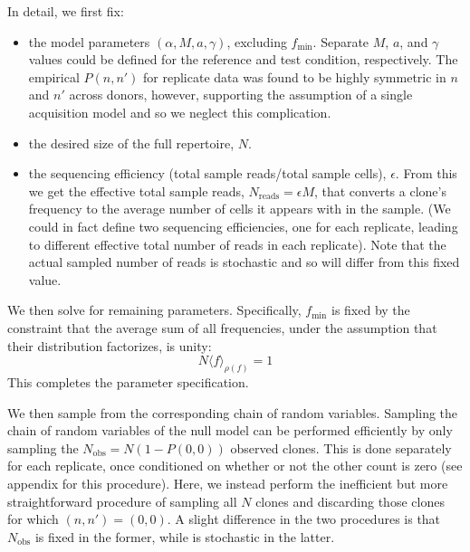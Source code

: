 \documentclass[letterpaper,english,prl,reprint,longbibliography]{revtex4-1} %
\begin{document}
In detail, we first fix:
\begin{itemize}
\item  the model parameters $(\alpha,M,a,\gamma)$, excluding $f_{\textrm{min}}$. Separate $M$, $a$, and $\gamma$ values could be defined for the reference and test condition, respectively. The empirical $P(n,n')$ for replicate data was found to be highly symmetric in $n$ and $n'$ across donors, however, supporting the assumption of a single acquisition model and so we neglect this complication. 
\item  the desired size of the full repertoire, $N$. 
\item the sequencing efficiency (total sample reads/total sample cells), $\epsilon$. From this we get the effective total sample reads, $N_{\textrm{reads}}=\epsilon M$, that converts a clone's frequency to the average number of cells it appears with in the sample. (We could in fact define two sequencing efficiencies, one for each replicate, leading to different effective total number of reads in each replicate). Note that the actual sampled number of reads is stochastic and so will differ from this fixed value.
\end{itemize}
We then solve for remaining parameters. Specifically, $f_{\textrm{min}}$ is fixed by the constraint that the average sum of all frequencies, under the assumption that their distribution factorizes, is unity:
\begin{equation}
	N \langle f\rangle_{\rho(f)}=1
\end{equation}
This completes the parameter specification.

We then sample from the corresponding chain of random variables.
Sampling the chain of random variables of the null model can be performed efficiently by only sampling the $N_{\textrm{obs}}=N(1-P(0,0))$ observed clones. This is done separately for each replicate, once conditioned on whether or not the other count is zero (see appendix for this procedure). Here, we instead perform the inefficient but more straightforward procedure of sampling all $N$ clones and discarding those clones for which $(n,n')=(0,0)$. A slight difference in the two procedures is that $N_{\textrm{obs}}$ is fixed in the former, while is stochastic in the latter.
\end{document}
